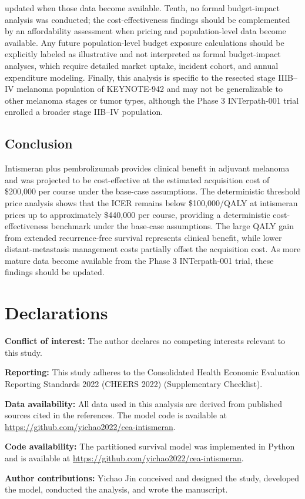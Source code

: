\documentclass[12pt,a4paper]{article}
\begin{document}
updated when those data become available. Tenth, no formal budget-impact analysis was conducted; the cost-effectiveness findings should be complemented by an affordability assessment when pricing and population-level data become available. Any future population-level budget exposure calculations should be explicitly labeled as illustrative and not interpreted as formal budget-impact analyses, which require detailed market uptake, incident cohort, and annual expenditure modeling. Finally, this analysis is specific to the resected stage IIIB--IV melanoma population of \mbox{KEYNOTE-942} and may not be generalizable to other melanoma stages or tumor types, although the Phase 3 \mbox{INTerpath-001} trial enrolled a broader stage IIB--IV population.

\subsection{Conclusion}

Intismeran plus \mbox{pembrolizumab} provides clinical benefit in adjuvant melanoma and was projected to be cost-effective at the estimated acquisition cost of \$200,000 per course under the base-case assumptions. The deterministic threshold price analysis shows that the ICER remains below \$100,000/QALY at intismeran prices up to approximately \$440,000 per course, providing a deterministic cost-effectiveness benchmark under the base-case assumptions. The large QALY gain from extended recurrence-free survival represents clinical benefit, while lower distant-metastasis management costs partially offset the acquisition cost. As more mature data become available from the Phase 3 \mbox{INTerpath-001} trial, these findings should be updated.

\section*{Declarations}

\textbf{Conflict of interest:} The author declares no competing interests relevant to this study.

\textbf{Reporting:} This study adheres to the Consolidated Health Economic Evaluation Reporting Standards 2022 (CHEERS 2022) \cite{husereau2022} (Supplementary Checklist).

\textbf{Data availability:} All data used in this analysis are derived from published sources cited in the references. The model code is available at \url{https://github.com/yichao2022/cea-intismeran}.

\textbf{Code availability:} The partitioned survival model was implemented in Python and is available at \url{https://github.com/yichao2022/cea-intismeran}.

\textbf{Author contributions:} Yichao Jin conceived and designed the study, developed the model, conducted the analysis, and wrote the manuscript.

\newpage

\end{document}
